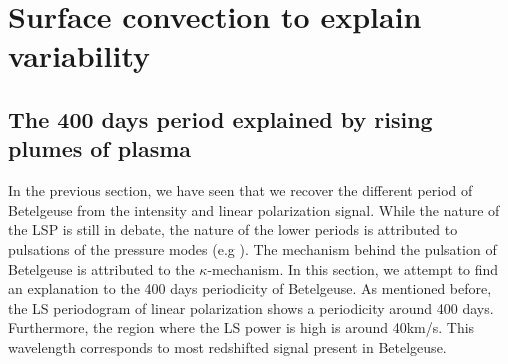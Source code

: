 \documentclass{aa}
\begin{document}
\section{Surface convection to explain variability}

\subsection{The 400 days period explained by rising plumes of plasma}

In the previous section, we have seen that we recover the different period of Betelgeuse from the intensity and linear polarization signal. 
While the nature of the LSP is still in debate, the nature of the lower periods is attributed to pulsations of the pressure modes 
(e.g \cite{kiss_variability_2006}). The mechanism behind the pulsation of Betelgeuse is attributed to the $\kappa$-mechanism. In this section, we attempt to 
find an explanation to the 400 days periodicity of Betelgeuse. As mentioned before, the LS periodogram of linear polarization shows a periodicity 
around 400 days. Furthermore, the region where the LS power is high is around 40km/s. This wavelength corresponds to most redshifted signal present in Betelgeuse.
\end{document}
